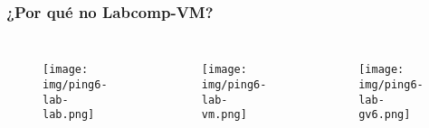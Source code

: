 \begin{frame}
  \frametitle{¿Por qué no Labcomp-VM?}
  \begin{columns}[t]
    	\begin{figure}
		\centering
		\texttt{[image: img/ping6-lab-lab.png]}
	\end{figure}
    	\begin{figure}
		\centering
		\texttt{[image: img/ping6-lab-vm.png]}
	\end{figure}
  	\begin{figure}
		\centering
		\texttt{[image: img/ping6-lab-gv6.png]}
	\end{figure}
  \end{columns}
\end{frame}





